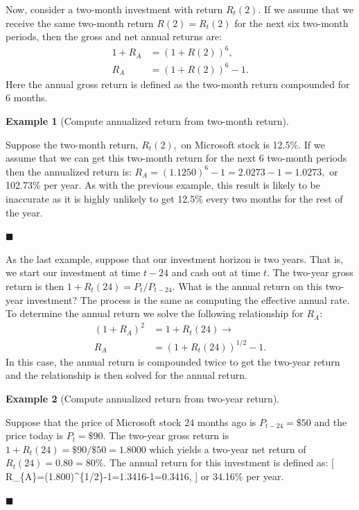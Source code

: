 \documentclass[
  letterpaper,
  DIV=11,
  numbers=noendperiod]{scrreprt}
\theoremstyle{definition}
\theoremstyle{definition}
\newtheorem{example}{Example}[chapter]
\theoremstyle{remark}
\begin{document}
Now, consider a two-month investment with return \(R_{t}(2).\) If we
assume that we receive the same two-month return \(R(2)=R_{t}(2)\) for
the next six two-month periods, then the gross and net annual returns
are: \begin{align*}
1+R_{A} & =(1+R(2))^{6},\\
R_{A} & =(1+R(2))^{6}-1.
\end{align*} Here the annual gross return is defined as the two-month
return compounded for 6 months.

\begin{example}[Compute annualized return from two-month
return]\protect\hypertarget{exm-example0112}{}\label{exm-example0112}

Suppose the two-month return, \(R_{t}(2),\) on Microsoft stock is
12.5\%. If we assume that we can get this two-month return for the next
6 two-month periods then the annualized return is:
\(R_{A}=(1.1250)^{6}-1=2.0273-1=1.0273,\) or 102.73\% per year. As with
the previous example, this result is likely to be inaccurate as it is
highly unlikely to get 12.5\% every two months for the rest of the year.

\hfill{}\(\blacksquare\)

\end{example}

As the last example, suppose that our investment horizon is two years.
That is, we start our investment at time \(t-24\) and cash out at time
\(t\). The two-year gross return is then \(1+R_{t}(24)=P_{t}/P_{t-24}\).
What is the annual return on this two-year investment? The process is
the same as computing the effective annual rate. To determine the annual
return we solve the following relationship for \(R_{A}\): \begin{align*}
(1+R_{A})^{2} & =1+R_{t}(24)\rightarrow\\
R_{A} & =\left(1+R_{t}(24)\right)^{1/2}-1.
\end{align*} In this case, the annual return is compounded twice to get
the two-year return and the relationship is then solved for the annual
return.

\begin{example}[Compute annualized return from two-year
return]\protect\hypertarget{exm-example0113}{}\label{exm-example0113}

Suppose that the price of Microsoft stock \(24\) months ago is
\(P_{t-24}=\$50\) and the price today is \(P_{t}=\$90\). The two-year
gross return is \(1+R_{t}(24)=\$90/\$50=1.8000\) which yields a two-year
net return of \(R_{t}(24)=0.80=80\%\). The annual return for this
investment is defined as: {[}
R\_\{A\}=(1.800)\^{}\{1/2\}-1=1.3416-1=0.3416, {]} or 34.16\% per year.

\hfill{}\(\blacksquare\)

\end{example}
\end{document}
